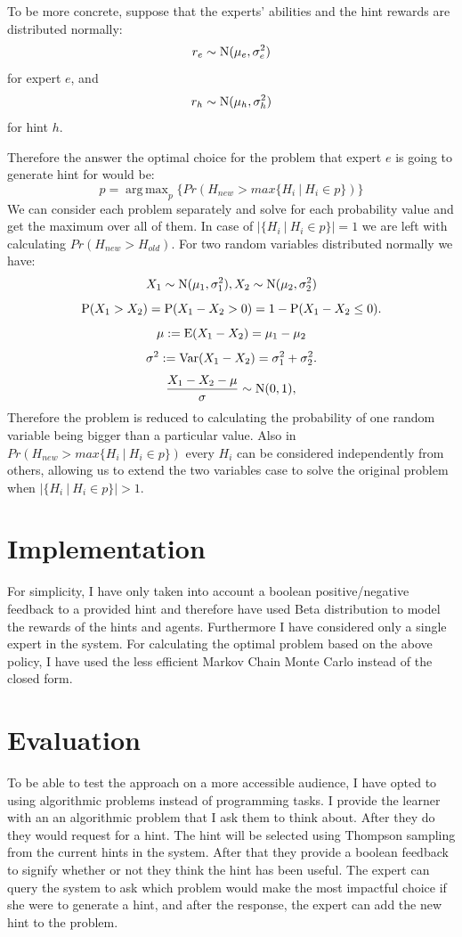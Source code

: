 \documentclass[conference]{IEEEtran}
\DeclareMathOperator*{\argmaxA}{arg\,max} %
\begin{document}
	To be more concrete, suppose that the experts' abilities and the hint rewards are distributed normally:
	$$
	r_e \sim {\rm N}(\mu_e,\sigma_e^2)
	$$
	for expert $e$, and
	$$
	r_h \sim {\rm N}(\mu_h,\sigma_h^2)
	$$
	for hint $h$.
	
	Therefore the answer the optimal choice for the problem that expert $e$ is going to generate hint for would be:
	$$
	p = \argmaxA_p \{ Pr(H_{new} > max \{H_{i}\ |\ H_i \in p\})\}
	$$
	We can consider each problem separately and solve for each probability value and get the maximum over all of them.
	In case of $|\{H_{i}\ |\ H_i \in p\}| = 1$ we are left with calculating $Pr(H_{new} > H_{old})$. 
	For two random variables distributed normally we have:
	$$
	X_1 \sim {\rm N}(\mu_1,\sigma_1^2), X_2 \sim {\rm N}(\mu_2,\sigma_2^2)
	$$
	$$
	{\rm P}(X_1  > X_2 ) = {\rm P}(X_1  - X_2  > 0) = 1 - {\rm P}(X_1  - X_2  \le 0).
	$$
	$$
	\mu := {\rm E}(X_1 - X_2) = \mu_1 - \mu_2
	$$
	$$
	\sigma^2 := {\rm Var}(X_1 - X_2) = \sigma_1^2 + \sigma_2^2.
	$$
	$$
	\frac{{X_1  - X_2  - \mu}}{{\sigma}} \sim {\rm N}(0,1),
	$$
	Therefore the problem is reduced to calculating the probability of one random variable being bigger than a particular value.
	Also in $Pr(H_{new} > max \{H_{i}\ |\ H_i \in p\})$ every $H_i$ can be considered independently from others, allowing us to 
	extend the two variables case to solve the original problem when $|\{H_{i}\ |\ H_i \in p\}| > 1$.


	\section{Implementation}		
	For simplicity, I have only taken into account a boolean positive/negative feedback to a provided hint and therefore have used Beta distribution to model the rewards of the hints and agents. Furthermore I have considered only a single expert in the system. For 
	calculating the optimal problem based on the above policy, I have used the less efficient Markov Chain Monte Carlo instead of the
	closed form.
	
	\section{Evaluation}
	To be able to test the approach on a more accessible audience, I have opted to using algorithmic problems instead of programming
	tasks. I provide the learner with an an algorithmic problem that I ask them to think about. After they do they would request for
	a hint. The hint will be selected using Thompson sampling from the current hints in the system. After that they provide a boolean
	feedback to signify whether or not they think the hint has been useful. The expert can query the system to ask which problem would
	make the most impactful choice if she were to generate a hint, and after the response, the expert can add the new hint to the problem.
	
\end{document}
